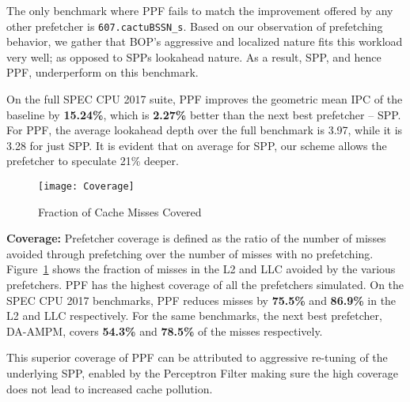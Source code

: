 The only benchmark where PPF fails to match the improvement offered by
any other prefetcher is {\tt 607.cactuBSSN\_s}. Based on our observation
of prefetching behavior, we gather that BOP's aggressive and localized
nature fits this workload very well; as opposed to SPPs lookahead
nature.  As a result, SPP, and hence PPF, underperform on this
benchmark.


On the full SPEC CPU 2017 suite, PPF improves the geometric mean IPC
of the baseline by \textbf{15.24\%}, which is \textbf{2.27\%} better
than the next best prefetcher -- SPP. {For PPF, the average 
lookahead depth over the full benchmark is 3.97, while it is 3.28 for just 
SPP. It is evident that on average for SPP, our scheme allows the 
prefetcher to speculate 21\% deeper.}

\begin{figure}[ht]
\texttt{[image: Coverage]}
\caption{Fraction of Cache Misses Covered}
\label{Fig:Coverage}
\end{figure}
%

\noindent \textbf{Coverage:} Prefetcher coverage is defined as the
ratio of the number of misses avoided through prefetching over the
number of misses with no prefetching.  Figure~\ref{Fig:Coverage} shows
the fraction of misses in the L2 and LLC avoided by the various
prefetchers.  PPF has the highest coverage of all the prefetchers
simulated.  On the SPEC CPU 2017 benchmarks, PPF reduces misses by
\textbf{75.5\%} and \textbf{86.9\%} in the L2 and LLC
respectively. For the same benchmarks, the next best prefetcher,
DA-AMPM, covers \textbf{54.3\%} and \textbf{78.5\%} of the misses
respectively.

This superior coverage of PPF can be attributed to aggressive
re-tuning of the underlying SPP, enabled by the Perceptron Filter
making sure the high coverage does not lead to increased cache
pollution.


